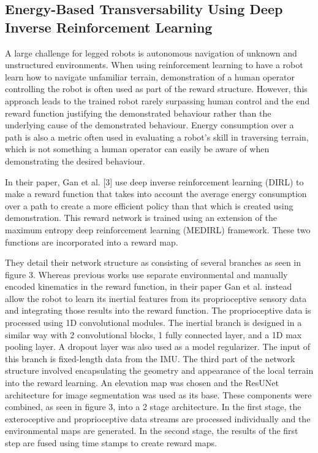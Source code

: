 \documentclass{article}
\begin{document}
\subsection{Energy-Based Transversability Using Deep Inverse Reinforcement Learning}

A large challenge for legged robots is autonomous navigation of unknown and unstructured environments. When using reinforcement learning to have a robot learn how to navigate unfamiliar terrain, demonstration of a human operator controlling the robot is often used as part of the reward structure. However, this approach leads to the trained robot rarely surpassing human control and the end reward function justifying the demonstrated behaviour rather than the underlying cause of the demonstrated behaviour. Energy consumption over a path is also a metric often used in evaluating a robot’s skill in traversing terrain, which is not something a human operator can easily be aware of when demonstrating the desired behaviour.

In their paper, Gan et al. [3] use deep inverse reinforcement learning (DIRL) to make a reward function that takes into account the average energy consumption over a path to create a more efficient policy than that which is created using demonstration. This reward network is trained using an extension of the maximum entropy deep reinforcement learning (MEDIRL) framework. These two functions are incorporated into a reward map. 

They detail their network structure as consisting of several branches as seen in figure 3. Whereas previous works use separate environmental and manually encoded kinematics in the reward function, in their paper Gan et al. instead allow the robot to learn its inertial features from its proprioceptive sensory data and integrating those results into the reward function. The proprioceptive data is processed using 1D convolutional modules. The inertial branch is designed in a similar way with 2 convolutional blocks, 1 fully connected layer, and a 1D max pooling layer. A dropout layer was also used as a model regularizer. The input of this branch is fixed-length data from the IMU. The third part of the network structure involved encapsulating the geometry and appearance of the local terrain into the reward learning. An elevation map was chosen and the ResUNet architecture for image segmentation was used as its base. These components were combined, as seen in figure 3, into a 2 stage architecture. In the first stage, the exteroceptive and proprioceptive data streams are processed individually and the environmental maps are generated. In the second stage, the results of the first step are fused using time stamps to create reward maps.
\end{document}
